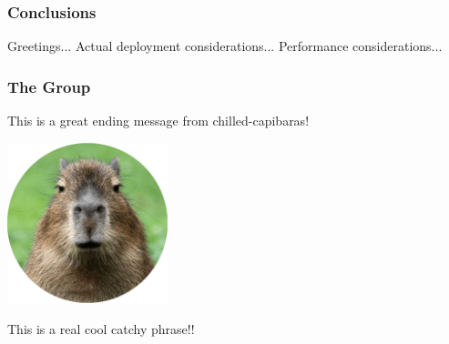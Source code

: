 \begin{frame} \frametitle{Conclusions}

Greetings...
\vfill
Actual deployment considerations...
\vfill
Performance considerations...

\end{frame}

\begin{frame} \frametitle{The Group}

This is a great ending message from chilled-capibaras!

\vfill
\begin{center}
	\includegraphics[width=0.35\textwidth]{img/capibara}
\end{center}
\vfill

This is a real cool catchy phrase!!

\end{frame}